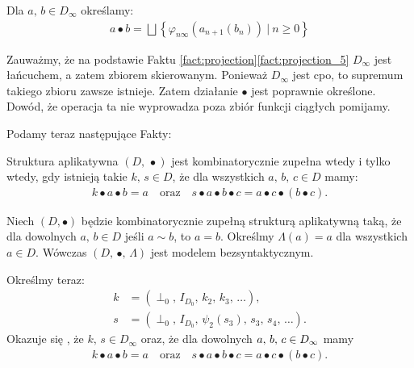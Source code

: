\begin{definicja}%
  Dla \(a,\,b\in D_\infty\) określamy:
\begin{align*}
a \bullet b = \bigsqcup\left\{\varphi_{n\infty}(a_{n+1}(b_n))\ |\ n\geq 0\right\}%
\end{align*}
\end{definicja}

Zauważmy, że na podstawie Faktu \ref{fact:projection}\ref{fact:projection_5} \(D_\infty\) jest łańcuchem, a zatem zbiorem skierowanym. Ponieważ \(D_\infty\) jest cpo, to supremum takiego zbioru zawsze istnieje. Zatem działanie \(\bullet\) jest poprawnie określone.
Dowód, że operacja ta nie wyprowadza poza zbiór funkcji ciągłych pomijamy. 

Podamy teraz następujące Fakty:

\begin{fakt}%
Struktura aplikatywna \((D,\,\bullet)\) jest kombinatorycznie zupełna wtedy i tylko wtedy, gdy istnieją takie \(k,\,s\in D\), że dla wszystkich \(a,\,b,\,c\in D\) mamy: 
\begin{align*}
k\bullet a\bullet b = a\quad \text{oraz}\quad s\bullet a \bullet b \bullet c = a\bullet c \bullet (b \bullet c).
\end{align*}
\end{fakt}

\begin{fakt}%
  Niech \((D,\bullet)\) będzie kombinatorycznie zupełną strukturą aplikatywną taką, że
  dla dowolnych \(a,\,b\in D\) jeśli \(a\sim b\), to \(a=b\).
  Określmy \(\Lambda(a)=a\) dla wszystkich \(a\in D\). Wówczas \((D,\,\bullet,\,\Lambda)\) jest modelem bezsyntaktycznym. 
\end{fakt}

Określmy teraz:
\begin{align*}
  k &=(\perp_0,\,I_{D_0},\,k_2,\,k_3,\,\dots),\\
  s &=(\perp_0,\,I_{D_0},\,\psi_2(s_3),\,s_3,\,s_4,\,\dots).
\end{align*}
Okazuje się \cite[Tw. 16.51, 16.53]{Hindley:2008:LCI:1388400}, że \(k,\,s\in D_\infty\) oraz, że dla dowolnych \(a,\,b,\,c\in\nobreak D_\infty\) mamy
\begin{align*}
  k\bullet a \bullet b = a\quad \text{oraz}\quad s\bullet a\bullet b\bullet c = a\bullet c\bullet (b\bullet c).
\end{align*}

